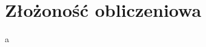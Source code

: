 \documentclass[knowledge.tex]{subfiles}
\begin{document}
    \chapter{Złożoność obliczeniowa}
    a
\end{document}
